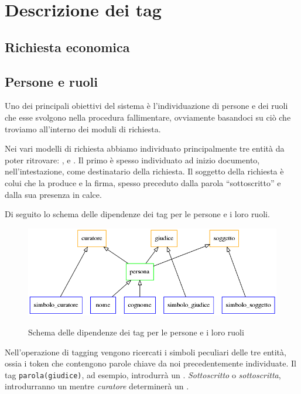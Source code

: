 
\section{Descrizione dei tag}

\subsection{Richiesta economica}

\subsection{Persone e ruoli}
Uno dei principali obiettivi del sistema è l'individuazione di persone e dei ruoli che esse svolgono nella procedura fallimentare, ovviamente basandoci su ciò che troviamo all'interno dei moduli di richiesta.

Nei vari modelli di richiesta abbiamo individuato principalmente tre entità da poter ritrovare: ,  e .
Il primo è spesso individuato ad inizio documento, nell'intestazione, come destinatario della richiesta.
Il soggetto della richiesta è colui che la produce e la firma, spesso preceduto dalla parola ``sottoscritto'' e dalla sua presenza in calce.

Di seguito lo schema delle dipendenze dei tag per le persone e i loro ruoli.

\begin{figure}[H]
\centering
\includegraphics[width=.7\textwidth]{img/persona.png}
\label{fig:persona}
\caption{Schema delle dipendenze dei tag per le persone e i loro ruoli}
\end{figure}

Nell'operazione di tagging vengono ricercati i simboli peculiari delle tre entità, ossia i token che contengono parole chiave da noi precedentemente individuate.
Il tag \verb|parola(giudice)|, ad esempio, introdurrà un . \emph{Sottoscritto} o \emph{sottoscritta}, introdurranno un  mentre \emph{curatore} determinerà un .

